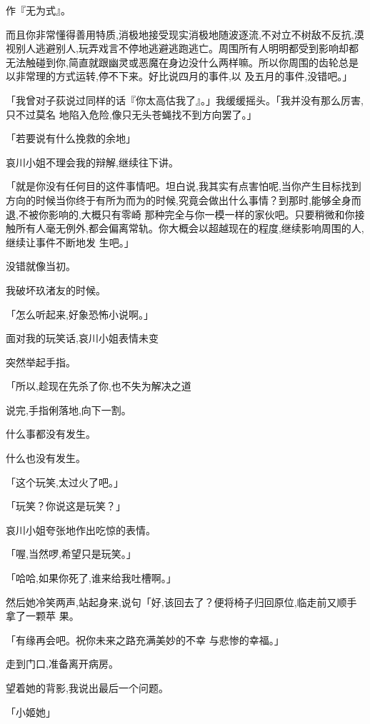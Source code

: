 \documentclass{article}
\begin{document}
\newpage
作『无为式』。 

而且你非常懂得善用特质,消极地接受现实消极地随波逐流,不对立不树敌不反抗,漠视别人逃避别人,玩弄戏言不停地逃避逃跑逃亡。周围所有人明明都受到影响却都无法触碰到你,简直就跟幽灵或恶魔在身边没什么两样嘛。所以你周围的齿轮总是以非常理的方式运转,停不下来。好比说四月的事件,以
及五月的事件,没错吧。」 

「我曾对子荻说过同样的话『你太高估我了』。」我缓缓摇头。「我并没有那么厉害,只不过莫名
地陷入危险,像只无头苍蝇找不到方向罢了。」 


「若要说有什么挽救的余地」 


哀川小姐不理会我的辩解,继续往下讲。 

「就是你没有任何目的这件事情吧。坦白说,我其实有点害怕呢,当你产生目标找到方向的时候当你终于有所为而为的时候,究竟会做出什么事情？到那时,能够全身而退,不被你影响的,大概只有零崎
\newpage
那种完全与你一模一样的家伙吧。只要稍微和你接触所有人毫无例外,都会偏离常轨。你大概会以超越现在的程度,继续影响周围的人,继续让事件不断地发
生吧。」 


没错就像当初。 


我破坏玖渚友的时候。 


「怎么听起来,好象恐怖小说啊。」 


面对我的玩笑话,哀川小姐表情未变 


突然举起手指。 

「所以,趁现在先杀了你,也不失为解决之道


说完,手指俐落地,向下一割。 



\newpage

什么事都没有发生。 


什么也没有发生。 


「这个玩笑,太过火了吧。」 


「玩笑？你说这是玩笑？」 


哀川小姐夸张地作出吃惊的表情。 


「喔,当然啰,希望只是玩笑。」 


「哈哈,如果你死了,谁来给我吐槽啊。」 

然后她冷笑两声,站起身来,说句「好,该回去了？便将椅子归回原位,临走前又顺手拿了一颗苹
果。 

「有缘再会吧。祝你未来之路充满美妙的不幸
与悲惨的幸福。」 


\newpage

走到门口,准备离开病房。 


望着她的背影,我说出最后一个问题。 


「小姬她」 
\end{document}
